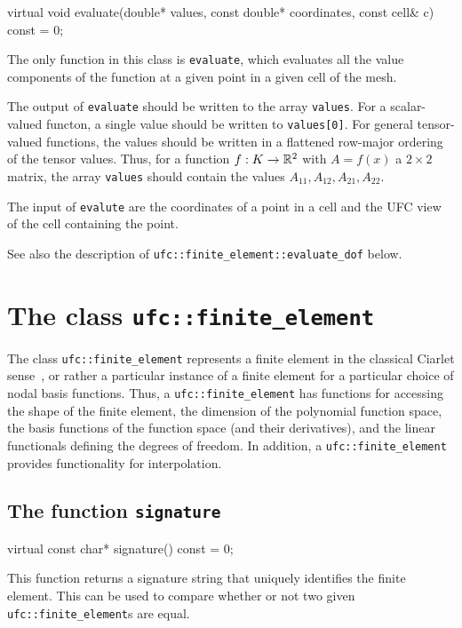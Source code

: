 \begin{code}
virtual void evaluate(double* values,
                      const double* coordinates,
                      const cell& c) const = 0;
\end{code}

The only function in this class is \texttt{evaluate},
which evaluates all the value components of the function at a given
point in a given cell of the mesh.

The output of \texttt{evaluate} should be written to the array
\texttt{values}. For a scalar-valued functon, a single value should be
written to \texttt{values[0]}. For general tensor-valued functions,
the values should be written in a flattened row-major ordering of the
tensor values. Thus, for a function $f : K \rightarrow \mathbb{R}^2$ with $A =
f(x)$ a $2 \times 2$ matrix, the array \texttt{values} should contain
the values $A_{11}, A_{12}, A_{21}, A_{22}$.

The input of \texttt{evalute} are the coordinates of a point in a cell and
the UFC view of the cell containing the point.

See also the description of \texttt{ufc::finite\_element::evaluate\_dof} below.

\section{The class \texttt{ufc::finite\_element}}

The class \texttt{ufc::finite\_element} represents a finite element in
the classical Ciarlet sense~\cite{Cia78}, or rather a particular
instance of a finite element for a particular choice of nodal basis
functions. Thus, a \texttt{ufc::finite\_element} has functions for
accessing the shape of the finite element, the dimension of the
polynomial function space, the basis functions of the function space
(and their derivatives), and the linear functionals defining the
degrees of freedom. In addition, a \texttt{ufc::finite\_element}
provides functionality for interpolation.

\subsection{The function \texttt{signature}}

\begin{code}
virtual const char* signature() const = 0;
\end{code}

This function returns a signature string that uniquely identifies the
finite element. This can be used to compare whether or not two given
\texttt{ufc::fi\-nite\_element}s are equal.

